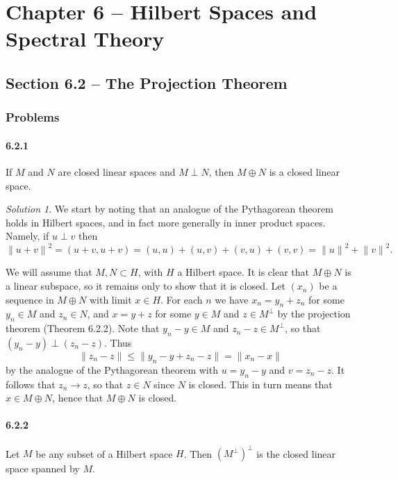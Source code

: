 \documentclass{report}
\newcommand{\norm}[1]{{\lVert #1 \rVert}}
\theoremstyle{remark}
\newtheorem*{solution}{Solution}
\begin{document}
\chapter*{Chapter 6 -- Hilbert Spaces and Spectral Theory}

\section*{Section 6.2 -- The Projection Theorem}

\subsection*{Problems}

\subsubsection*{6.2.1}
If $M$ and $N$ are closed linear spaces and $M \perp N$, then $M \oplus N$ is a closed linear space.

\begin{solution}
  We start by noting that an analogue of the Pythagorean theorem holds in Hilbert spaces, and in fact more generally in inner product spaces. Namely, if $u \perp v$ then
  \begin{equation*}
    \norm{u+v}^2 = (u+v,u+v) = (u,u) + (u,v) + (v,u) + (v,v) = \norm{u}^2 + \norm{v}^2.
  \end{equation*}

  We will assume that $M, N \subset H$, with $H$ a Hilbert space. It is clear that $M \oplus N$ is a linear subspace, so it remains only to show that it is closed. Let $(x_n)$ be a sequence in $M \oplus N$ with limit $x \in H$. For each $n$ we have $x_n = y_n + z_n$ for some $y_n \in M$ and $z_n \in N$, and $x = y + z$ for some $y \in M$ and $z \in M^\perp$ by the projection theorem (Theorem 6.2.2). Note that $y_n - y \in M$ and $z_n - z \in M^\perp$, so that $(y_n - y) \perp (z_n - z)$. Thus
  \begin{equation*}
    \norm{z_n - z} \le \norm{y_n - y + z_n - z} = \norm{x_n - x}
  \end{equation*}
  by the analogue of the Pythagorean theorem with $u = y_n - y$ and $v = z_n - z$. It follows that $z_n \to z$, so that $z \in N$ since $N$ is closed. This in turn means that $x \in M \oplus N$, hence that $M \oplus N$ is closed.
\end{solution}

\subsubsection*{6.2.2}
Let $M$ be any subset of a Hilbert space $H$. Then $(M^\perp)^\perp$ is the closed linear space spanned by $M$.
\end{document}
